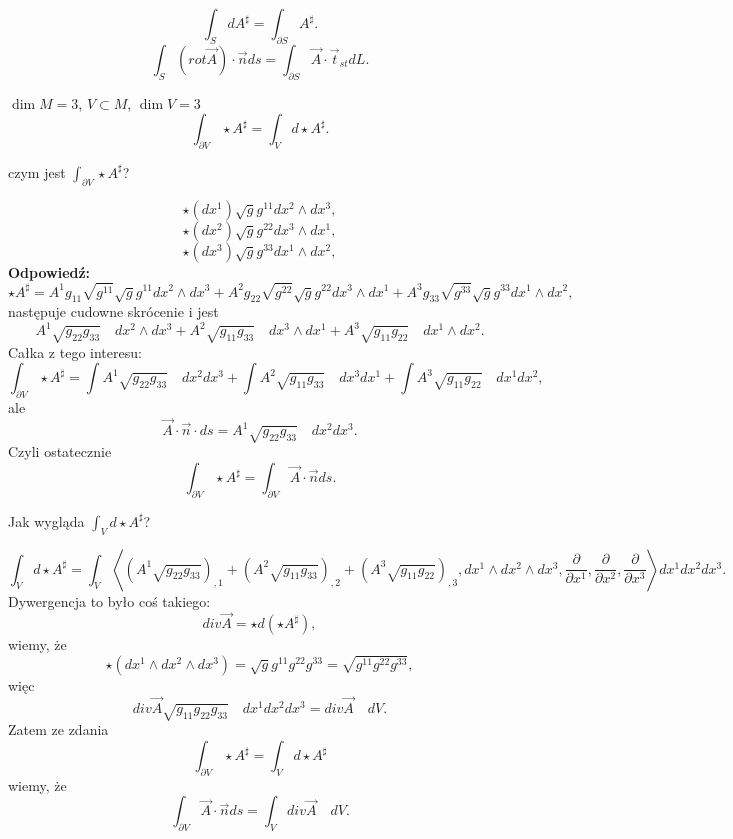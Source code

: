 \documentclass[../main.tex]{subfiles}
\begin{document}
\[
\int_S dA^\sharp = \int_{\partial S}A^\sharp
.\]
\[
    \int_S\left( rot \vec{A} \right) \cdot \vec{n} ds = \int_{\partial S}\vec{A} \cdot \vec{t}_{st}dL
.\]
\begin{przyklad}
    $\dim M = 3$, $V \subset M$, $\dim V = 3$
     \[
    \int_{\partial V}\star A^\sharp = \int_V d\star A^\sharp
    .\]
\end{przyklad}
\begin{pytanie}
czym jest $\int_{\partial V}\star A^\sharp$?
\end{pytanie}
\[
    \star(dx^{1})\sqrt{g}g^{11}  dx^{2}\land dx^{3}
,\]
\[
    \star(dx^{2})\sqrt{g}g^{22}  dx^{3}\land dx^{1}
,\]
\[
    \star(dx^{3})\sqrt{g}g^{33}  dx^{1}\land dx^{2}
,\]
\textbf{Odpowiedź:}
\[
\star A^\sharp = A^1g_{11}\sqrt{g^{11}} \sqrt{g} g^{11}dx^{2} \land dx^{3} + A^2 g_{22}\sqrt{g^{22}} \sqrt{g} g^{22} dx^{3} \land dx^{1} + A^3 g_{33}\sqrt{g^{33}} \sqrt{g} g^{33}dx^{1} \land dx^{2}
,\]
następuje cudowne skrócenie i jest
\[
A^1 \sqrt{g_{22}g_{33}}\quad dx^{2} \land dx^{3}  + A^2 \sqrt{g_{11}g_{33}} \quad dx^{3} \land dx^{1} + A^3 \sqrt{g_{11}g_{22}} \quad dx^{1} \land dx^{2}
.\]
Całka z tego interesu:
\[
\int_{\partial V}\star A^\sharp = \int A^1 \sqrt{g_{22}g_{33}}\quad dx^{2} dx^{3} + \int A^2 \sqrt{g_{11}g_{33}}\quad dx^{3} dx^{1} + \int A^3 \sqrt{g_{11}g_{22}} \quad dx^{1}  dx^{2}
,\]
ale
\[
    \vec{A}\cdot \vec{n}\cdot ds = A^1 \sqrt{g_{22}g_{33}}\quad dx^{2} dx^{3}
.\]
Czyli ostatecznie
\[
    \int_{\partial V}\star A^\sharp = \int_{\partial V}\vec{A}\cdot \vec{n}ds
.\]
\begin{pytanie}
Jak wygląda $\int_Vd\star A^\sharp$?
\end{pytanie}
\[
    \int_{V}d\star A^\sharp = \int_{V} \left< \left( A^1\sqrt{g_{22}g_{33}} \right)_{,1} + \left( A^2\sqrt{g_{11}g_{33}}  \right) _{,2} + \left( A^3\sqrt{g_{11}g_{22}}  \right) _{,3}, dx^{1} \land dx^{2} \land dx^{3} , \frac{\partial }{\partial x^1} , \frac{\partial }{\partial x^2} , \frac{\partial }{\partial x^3} \right> dx^{1} dx^{2} dx^{3}
.\]
Dywergencja to było coś takiego:
\[
    div \vec{A} = \star d\left( \star A^\sharp \right)
,\]
wiemy, że
\[
    \star\left( dx^{1} \land dx^{2} \land dx^{3}  \right) = \sqrt{g} g^{11}g^{22}g^{33} = \sqrt{g^{11}g^{22}g^{33}}
,\]
więc
\[
    div \vec{A} \sqrt{g_{11}g_{22}g_{33}}\quad dx^{1} dx^{2} dx^{3}= div\vec{A}\quad dV
.\]
Zatem ze zdania
\[
\int_{\partial V}\star A^\sharp = \int_V d\star A^\sharp
\]
wiemy, że
\[
    \int_{\partial V}\vec{A}\cdot \vec{n} ds = \int_V div \vec{A} \quad dV
.\]
\end{document}
